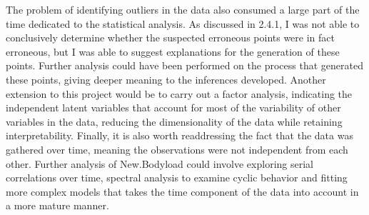 \hfill\break
\newline
The problem of identifying outliers in the data also consumed a large part of the time dedicated to the statistical analysis. As discussed in 2.4.1, I was not able to conclusively determine whether the suspected erroneous points were in fact erroneous, but I was able to suggest explanations for the generation of these points. Further analysis could have been performed on the process that generated these points, giving deeper meaning to the inferences developed. Another extension to this project would be to carry out a factor analysis, indicating the independent latent variables that account for most of the variability of other variables in the data, reducing the dimensionality of the data while retaining interpretability.
\hfill\break
\newline
Finally, it is also worth readdressing the fact that the data was gathered over time, meaning the observations were not independent from each other. Further analysis of New.Bodyload could involve exploring serial correlations over time, spectral analysis to examine cyclic behavior and fitting more complex models that takes the time component of the data into account in a more mature manner.





